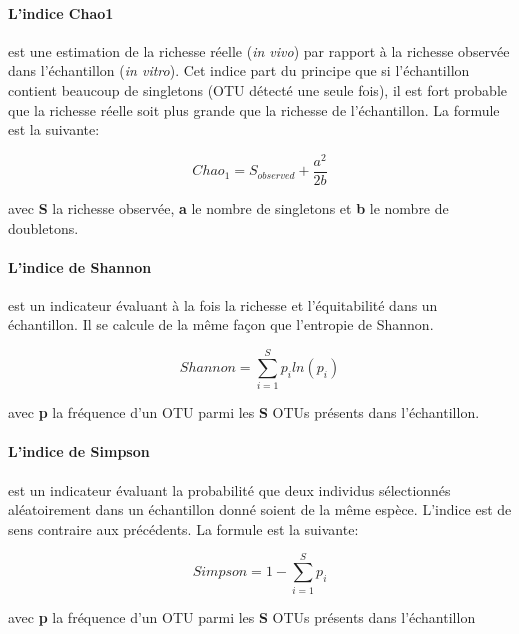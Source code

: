 \documentclass[12pt,a4paper]{article}
\begin{document}
\paragraph{L'indice Chao1}est une estimation de la richesse réelle (\textit{in vivo}) par rapport à la richesse observée dans l'échantillon (\textit{in vitro}). Cet indice part du principe que si l’échantillon contient beaucoup de singletons (OTU détecté une seule fois), il est fort probable que la richesse réelle soit plus grande que la richesse de l’échantillon. La formule est la suivante:

\begin{mycapequ}[!h]
   \begin{equation}
     Chao_{1} = S_{observed} + \frac{a^2}{2b}
   \end{equation}
      \caption{avec \textbf{S} la richesse observée, \textbf{a} le nombre de singletons et \textbf{b} le nombre de doubletons.}
\end{mycapequ}

\paragraph{L'indice de Shannon} est un indicateur évaluant à la fois la richesse et l'équitabilité dans un échantillon. Il se calcule de la même façon que l’entropie de Shannon.

\begin{mycapequ}[!h]
   \begin{equation}
     Shannon = \sum_{i=1}^Sp_{i}ln(p_{i})
   \end{equation}
      \caption{avec \textbf{p} la fréquence d'un OTU parmi les \textbf{S} OTUs présents dans l'échantillon.}
\end{mycapequ}

\paragraph{L'indice de Simpson}est un indicateur évaluant la probabilité que deux individus sélectionnés aléatoirement dans un échantillon donné soient de la même espèce. L'indice est de sens contraire aux précédents. La formule est la suivante:

\begin{mycapequ}[!h]
   \begin{equation}
     Simpson = 1 - \sum_{i=1}^Sp_{i}
   \end{equation}
      \caption{avec \textbf{p} la fréquence d'un OTU parmi les \textbf{S} OTUs présents dans l'échantillon}
\end{mycapequ}
\end{document}
